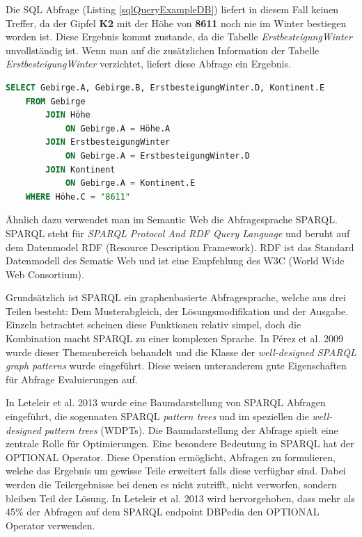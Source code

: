 \documentclass[draft,final]{vutinfth} %
\begin{document}
Die SQL Abfrage (Listing \ref{sqlQueryExampleDB}) liefert in diesem Fall keinen Treffer, da der Gipfel \textbf{K2} mit der Höhe von \textbf{8611} noch nie im Winter bestiegen worden ist. Diese Ergebnis kommt zustande, da die Tabelle \textit{ErstbesteigungWinter} unvollständig ist. Wenn man auf die zusätzlichen Information der Tabelle \textit{ErstbesteigungWinter} verzichtet, liefert diese Abfrage ein Ergebnis.

\begin{lstlisting}[language=SQL,caption={SELECT DB Beispiel},frame = single,label={sqlQueryExampleDB}]
SELECT Gebirge.A, Gebirge.B, ErstbesteigungWinter.D, Kontinent.E
	FROM Gebirge 
		JOIN Höhe
			ON Gebirge.A = Höhe.A
		JOIN ErstbesteigungWinter 
			ON Gebirge.A = ErstbesteigungWinter.D
		JOIN Kontinent
			ON Gebirge.A = Kontinent.E
	WHERE Höhe.C = "8611"
\end{lstlisting}



Ähnlich dazu verwendet man im Semantic Web die Abfragesprache SPARQL. SPARQL steht für \textit{SPARQL Protocol And RDF Query Language} und beruht auf dem Datenmodel RDF (Resource Description Framework). RDF ist das Standard Datenmodell des Sematic Web und ist eine Empfehlung des W3C (World Wide Web Consortium). 

Grundsätzlich ist SPARQL ein graphenbasierte Abfragesprache, welche aus drei Teilen besteht: Dem Musterabgleich, der Lösungsmodifikation und der Ausgabe. Einzeln betrachtet scheinen diese Funktionen relativ simpel, doch die Kombination macht SPARQL zu einer komplexen Sprache. In P{\'e}rez et al. 2009 \cite{PAG09} wurde dieser Themenbereich behandelt und die Klasse der \textit{well-designed SPARQL graph patterns} wurde eingeführt. Diese weisen unteranderem gute Eigenschaften für Abfrage Evaluierungen auf.

In Leteleir et al. 2013 \cite{LPPS2013} wurde eine Baumdarstellung von SPARQL Abfragen eingeführt, die sogennaten SPARQL \textit{pattern trees} und im speziellen die \textit{well-designed pattern trees} (WDPTs). Die Baumdarstellung der Abfrage spielt eine zentrale Rolle für Optimierungen. Eine besondere Bedeutung in SPARQL hat der OPTIONAL Operator. Diese Operation ermöglicht, Abfragen zu formulieren, welche das Ergebnis um gewisse Teile erweitert falls diese verfügbar sind. Dabei werden die Teilergebnisse bei denen es nicht zutrifft, nicht verworfen, sondern bleiben Teil der Lösung. In Leteleir et al. 2013 \cite{LPPS2013} wird hervorgehoben, dass mehr als 45\% der Abfragen auf dem SPARQL endpoint DBPedia den OPTIONAL Operator verwenden.
\end{document}

